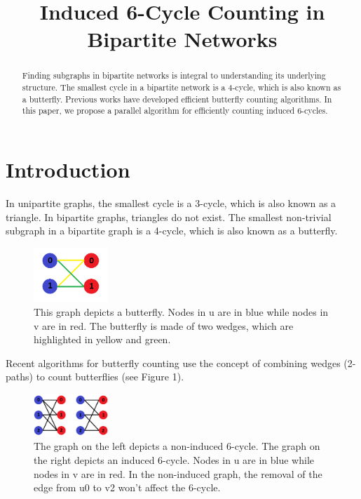\documentclass{article}
\title{Induced 6-Cycle Counting in Bipartite Networks}
\begin{document}
\maketitle

\begin{abstract}
Finding subgraphs in bipartite networks is integral to understanding its underlying structure. The smallest cycle in a bipartite network is a 4-cycle, which is also known as a butterfly. Previous works have developed efficient butterfly counting algorithms. In this paper, we propose a parallel algorithm for efficiently counting induced 6-cycles.
\end{abstract}

\section{Introduction}
In unipartite graphs, the smallest cycle is a 3-cycle, which is also known as a triangle. In bipartite graphs, triangles do not exist. The smallest non-trivial subgraph in a bipartite graph is a 4-cycle, which is also known as a butterfly.

\begin{figure}[h]
    \centering
    \includegraphics[width=0.25\textwidth]{figures/Butterfly.png}
    \caption{\small This graph depicts a butterfly. Nodes in u are in blue while nodes in v are in red. The butterfly is made of two wedges, which are highlighted in yellow and green.}
    \label{fig:butterfly}
\end{figure}

Recent algorithms for butterfly counting use the concept of combining wedges (2-paths) to count butterflies (see Figure 1).


\begin{figure}[h]
    \centering
    \includegraphics[width=0.25\textwidth]{figures/Induced vs Noninduced.png}
    \caption{\small The graph on the left depicts a non-induced 6-cycle. The graph on the right depicts an induced 6-cycle. Nodes in u are in blue while nodes in v are in red. In the non-induced graph, the removal of the edge from u0 to v2 won't affect the 6-cycle.}
    \label{fig:induced}
\end{figure}
\end{document}
